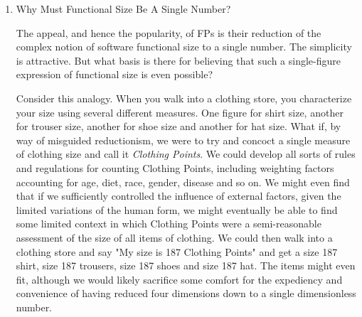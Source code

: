 \documentclass{article}
\begin{document}
\begin{enumerate}
FPs have attracted their own league of True Believers -- like many
technical schools whose tenets, lacking an empirical basis, can only be
defended by the emotional invective of their adherents. I encountered
one such adherent recently in David Anderson, author of "Agile Project
Management." Anderson made some rather pompous observations \footnote{\url{http://www.agilemanagement.net/Articles/Weblog/WorldClassVelocity.html}} on his
blog as to how surprising it was that people should express disbelief
regarding his claims to 5 and 10-fold increases in productivity using
TDD, AM and (insert favorite acronym here)FDD. I replied that their
incredulity might stem from the boldness of his claims or the means by
which he collected his data, rather than an inherently obstreperous
attitude. He indicated his productivity data was expressed in FPs per
unit time! I tried explaining to him that FPs cannot be used to measure
productivity, because not all FPs are created equal, as explained above.
He wasn't interested. That discussion has now been deleted from his
blog. He also denied me permission to reproduce that portion of it which
occurred in email.

Such is the attitude I typically encounter when dealing with self-styled
gurus and experts. There is much talk of science and data, but as soon
as you express doubt regarding their claims, there is a quick resort to
insult and posture. Ironic, given that doubt and criticism are the basic
mechanisms that give science the credibility that such charlatans seek
to cloak themselves in.

\item Why Must Functional Size Be A Single Number?
\label{sec:orgheadline385}

The appeal, and hence the popularity, of FPs is their reduction of the
complex notion of software functional size to a single number. The
simplicity is attractive. But what basis is there for believing that
such a single-figure expression of functional size is even possible?

Consider this analogy. When you walk into a clothing store, you
characterize your size using several different measures. One figure for
shirt size, another for trouser size, another for shoe size and another
for hat size. What if, by way of misguided reductionism, we were to try
and concoct a single measure of clothing size and call it \emph{Clothing
Points}. We could develop all sorts of rules and regulations for
counting Clothing Points, including weighting factors accounting for
age, diet, race, gender, disease and so on. We might even find that if
we sufficiently controlled the influence of external factors, given the
limited variations of the human form, we might eventually be able to
find some limited context in which Clothing Points were a
semi-reasonable assessment of the size of all items of clothing. We
could then walk into a clothing store and say "My size is 187 Clothing
Points" and get a size 187 shirt, size 187 trousers, size 187 shoes and
size 187 hat. The items might even fit, although we would likely
sacrifice some comfort for the expediency and convenience of having
reduced four dimensions down to a single dimensionless number.


\end{enumerate}
\end{document}
